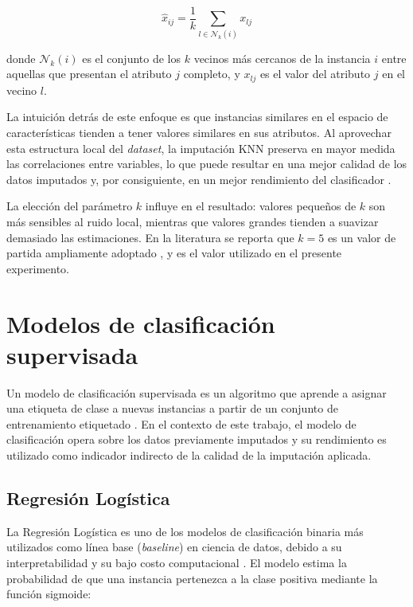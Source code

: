 \begin{equation}
    \hat{x}_{ij} = \frac{1}{k} \sum_{l \in \mathcal{N}_k(i)} x_{lj}
\end{equation}

donde $\mathcal{N}_k(i)$ es el conjunto de los $k$ vecinos más cercanos de
la instancia $i$ entre aquellas que presentan el atributo $j$ completo, y
$x_{lj}$ es el valor del atributo $j$ en el vecino $l$.

La intuición detrás de este enfoque es que instancias similares en el
espacio de características tienden a tener valores similares en sus
atributos. Al aprovechar esta estructura local del \textit{dataset}, la imputación
KNN preserva en mayor medida las correlaciones entre variables, lo que
puede resultar en una mejor calidad de los datos imputados y, por
consiguiente, en un mejor rendimiento del clasificador
\parencite{salgado2016}.

La elección del parámetro $k$ influye en el resultado: valores pequeños
de $k$ son más sensibles al ruido local, mientras que valores grandes
tienden a suavizar demasiado las estimaciones. En la literatura se reporta
que $k = 5$ es un valor de partida ampliamente adoptado
\parencite{salgado2016}, y es el valor utilizado en el presente experimento.

\section{Modelos de clasificación supervisada}

Un modelo de clasificación supervisada es un algoritmo que aprende a
asignar una etiqueta de clase a nuevas instancias a partir de un conjunto
de entrenamiento etiquetado \parencite{bishop2006}. En el contexto de este
trabajo, el modelo de clasificación opera sobre los datos previamente
imputados y su rendimiento es utilizado como indicador indirecto de la
calidad de la imputación aplicada.

\subsection{Regresión Logística}

La Regresión Logística es uno de los modelos de clasificación binaria más
utilizados como línea base (\textit{baseline}) en ciencia de datos, debido
a su interpretabilidad y su bajo costo computacional
\parencite{bishop2006}. El modelo estima la probabilidad de que una
instancia pertenezca a la clase positiva mediante la función sigmoide:

